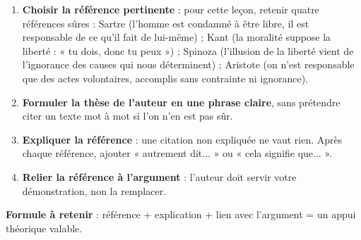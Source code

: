 \documentclass[11pt]{article}
\begin{document}
\begin{methode}
\begin{enumerate}
\item \textbf{Choisir la référence pertinente} : pour cette leçon, retenir quatre références sûres : Sartre (l'homme est condamné à être libre, il est responsable de ce qu'il fait de lui-même) ; Kant (la moralité suppose la liberté : « tu dois, donc tu peux ») ; Spinoza (l'illusion de la liberté vient de l'ignorance des causes qui nous déterminent) ; Aristote (on n'est responsable que des actes volontaires, accomplis sans contrainte ni ignorance).
\item \textbf{Formuler la thèse de l'auteur en une phrase claire}, sans prétendre citer un texte mot à mot si l'on n'en est pas sûr.
\item \textbf{Expliquer la référence} : une citation non expliquée ne vaut rien. Après chaque référence, ajouter « autrement dit... » ou « cela signifie que... ».
\item \textbf{Relier la référence à l'argument} : l'auteur doit servir votre démonstration, non la remplacer.
\end{enumerate}
\textbf{Formule à retenir} : référence + explication + lien avec l'argument = un appui théorique valable.
\end{methode}
\end{document}
